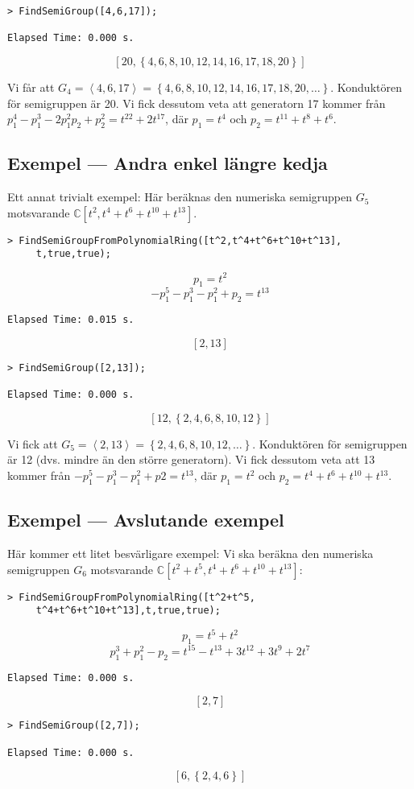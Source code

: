 \begin{verbatim}
> FindSemiGroup([4,6,17]);

Elapsed Time: 0.000 s.
\end{verbatim}
\[\left[20, \left\{4, 6, 8, 10, 12, 14, 16, 17, 18, 20\right\}\right]\]

Vi får att $G_4 = \left<4, 6, 17\right>=\left\{4, 6, 8, 10, 12, 14, 16, 17, 18, 20, \ldots\right\}$. Konduktören för semigruppen är 20. Vi fick dessutom veta att generatorn 17 kommer från $p_1^4 -p_1^3 - 2 p_1^2 p_2 +p_2^2 = t^{22} + 2 t^{17}$, där $p_1 = t^4$ och $p_2 = t^{11} +t^8 +t^6$.

\subsection{Exempel --- Andra enkel längre kedja}

Ett annat trivialt exempel: Här beräknas den numeriska semigruppen $G_5$ motsvarande $\mathbb{C}\left[t^2, t^4 + t^6 + t^{10} + t^{13}\right]$.

\begin{verbatim}
> FindSemiGroupFromPolynomialRing([t^2,t^4+t^6+t^10+t^13],
     t,true,true);
\end{verbatim}
\[p_1 = t^2\]
\[-p_1^5 - p_1^3 - p_1^2 + p_2 = t^{13}\]
\begin{verbatim}
Elapsed Time: 0.015 s.
\end{verbatim}
\[\left[2, 13\right]\]
\begin{verbatim}
> FindSemiGroup([2,13]);

Elapsed Time: 0.000 s.
\end{verbatim}
\[\left[12, \left\{2, 4, 6, 8, 10, 12\right\}\right]\]

Vi fick att $G_5 = \left<2, 13\right>=\left\{2, 4, 6, 8, 10, 12, \ldots\right\}$. Konduktören för semigruppen är 12 (dvs. mindre än den större generatorn). Vi fick dessutom veta att 13 kommer från $-p_1^5-p_1^3-p_1^2+p2 = t^{13}$, där $p_1 = t^2$ och $p_2 = t^4+t^6+t^{10}+t^{13}$.

\subsection{Exempel --- Avslutande exempel}

Här kommer ett litet besvärligare exempel: Vi ska beräkna den numeriska semigruppen $G_6$ motsvarande $\mathbb{C}\left[t^2 + t^5, t^4 + t^6 + t^{10} + t^{13}\right]$:

\begin{verbatim}
> FindSemiGroupFromPolynomialRing([t^2+t^5,
     t^4+t^6+t^10+t^13],t,true,true);
\end{verbatim}
\[p_1 = t^5+t^2\]
\[p_1^3+p_1^2-p_2 = t^{15}-t^{13}+3t^{12}+3t^9+2t^7\]
\begin{verbatim}
Elapsed Time: 0.000 s.
\end{verbatim}
\[\left[2, 7\right]\]
\begin{verbatim}
> FindSemiGroup([2,7]);

Elapsed Time: 0.000 s.
\end{verbatim}
\[\left[6, \left\{2, 4, 6\right\}\right]\]

